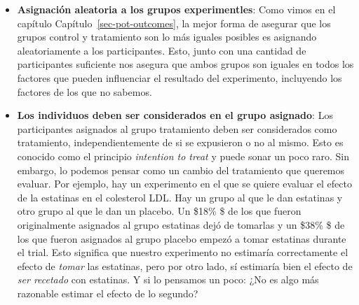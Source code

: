 \documentclass[
  letterpaper,
  DIV=11,
  numbers=noendperiod,
  oneside]{scrreprt}
\begin{document}
\begin{itemize}
\item
  \textbf{Asignación aleatoria a los grupos experimentles}: Como vimos
  en el capítulo Capítulo~\ref{sec-pot-outcomes}, la mejor forma de
  asegurar que los grupos control y tratamiento son lo más iguales
  posibles es asignando aleatoriamente a los participantes. Esto, junto
  con una cantidad de participantes suficiente nos asegura que ambos
  grupos son iguales en todos los factores que pueden influenciar el
  resultado del experimento, incluyendo los factores de los que no
  sabemos.
\item
  \textbf{Los individuos deben ser considerados en el grupo asignado}:
  Los participantes asignados al grupo tratamiento deben ser
  considerados como tratamiento, independientemente de si se expusieron
  o no al mismo. Esto es conocido como el principio \emph{intention to
  treat} y puede sonar un poco raro. Sin embargo, lo podemos pensar como
  un cambio del tratamiento que queremos evaluar. Por ejemplo, hay un
  experimento en el que se quiere evaluar el efecto de la estatinas en
  el colesterol LDL. Hay un grupo al que le dan estatinas y otro grupo
  al que le dan un placebo. Un \$18\% \$ de los que fueron originalmente
  asignados al grupo estatinas dejó de tomarlas y un \$38\% \$ de los
  que fueron asignados al grupo placebo empezó a tomar estatinas durante
  el trial. Esto significa que nuestro experimento no estimaría
  correctamente el efecto de \emph{tomar} las estatinas, pero por otro
  lado, sí estimaría bien el efecto de \emph{ser recetado} con
  estatinas. Y si lo pensamos un poco: ¿No es algo más razonable estimar
  el efecto de lo segundo?
\end{itemize}
\end{document}
